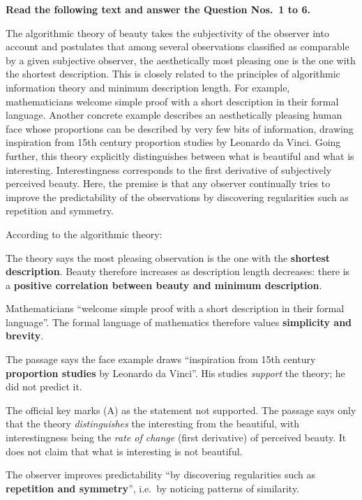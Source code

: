 \textbf{Read the following text and answer the Question Nos.~1 to 6.}\par\smallskip
The algorithmic theory of beauty takes the subjectivity of the observer into account and postulates that among several observations classified as comparable by a given subjective observer, the aesthetically most pleasing one is the one with the shortest description. This is closely related to the principles of algorithmic information theory and minimum description length. For example, mathematicians welcome simple proof with a short description in their formal language. Another concrete example describes an aesthetically pleasing human face whose proportions can be described by very few bits of information, drawing inspiration from 15th century proportion studies by Leonardo da Vinci. Going further, this theory explicitly distinguishes between what is beautiful and what is interesting. Interestingness corresponds to the first derivative of subjectively perceived beauty. Here, the premise is that any observer continually tries to improve the predictability of the observations by discovering regularities such as repetition and symmetry.

According to the algorithmic theory:

The theory says the most pleasing observation is the one with the \textbf{shortest description}. Beauty therefore increases as description length decreases: there is a \textbf{positive correlation between beauty and minimum description}.

Mathematicians ``welcome simple proof with a short description in their formal language''. The formal language of mathematics therefore values \textbf{simplicity and brevity}.

The passage says the face example draws ``inspiration from 15th century \textbf{proportion studies} by Leonardo da Vinci''. His studies \emph{support} the theory; he did not predict it.

The official key marks (A) as the statement not supported. The passage says only that the theory \emph{distinguishes} the interesting from the beautiful, with interestingness being the \emph{rate of change} (first derivative) of perceived beauty. It does not claim that what is interesting is not beautiful.

The observer improves predictability ``by discovering regularities such as \textbf{repetition and symmetry}'', i.e.\ by noticing patterns of similarity.

